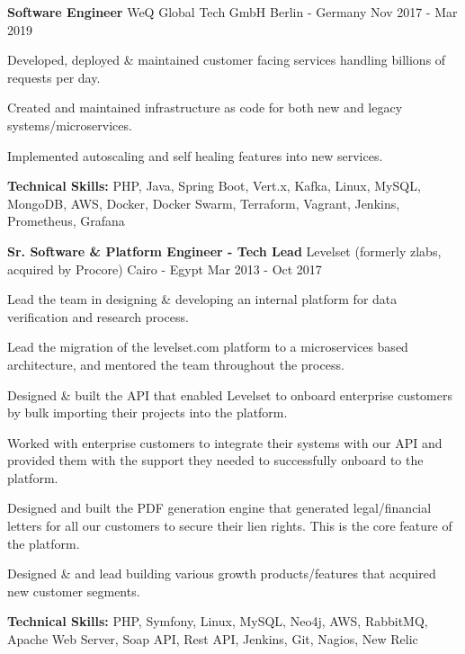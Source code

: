 \begin{cventries}
	\cventry
	{\textbf{Software Engineer}} %
	{WeQ Global Tech GmbH} %
	{Berlin - Germany} %
	{Nov 2017 - Mar 2019} %
	{
		\begin{cvitems} %
			\item {Developed, deployed \& maintained customer facing services handling billions of requests per day.}
			\item {Created and maintained infrastructure as code for both new and legacy systems/microservices.}
			\item {Implemented autoscaling and self healing features into new services.}
			\item {\textbf{Technical Skills:} PHP, Java, Spring Boot, Vert.x, Kafka, Linux, MySQL, MongoDB, AWS, Docker,
			            Docker Swarm, Terraform, Vagrant, Jenkins, Prometheus, Grafana}
		\end{cvitems}
	}

	\cventry
	{\textbf{Sr. Software \& Platform Engineer - Tech Lead}} %
	{Levelset (formerly zlabs, acquired by Procore)} %
	{Cairo - Egypt} %
	{Mar 2013 - Oct 2017} %
	{
		\begin{cvitems} %
			\item {Lead the team in designing \& developing an internal platform for data verification and research process.}
			\item {Lead the migration of the levelset.com platform to a microservices based architecture, and mentored the
			            team throughout the process.}
			\item {Designed \& built the API that enabled Levelset to onboard enterprise customers by bulk importing their
			            projects into the platform.}
			\item {Worked with enterprise customers to integrate their systems with our API and provided them with the support
			            they needed to successfully onboard to the platform.}
			\item {Designed and built the PDF generation engine that generated legal/financial letters for all our customers
			            to secure their lien rights. This is the core feature of the platform.}
			\item {Designed \& and lead building various growth products/features that acquired new customer segments.}
			\item {\textbf{Technical Skills:} PHP, Symfony, Linux, MySQL, Neo4j, AWS, RabbitMQ, Apache Web Server, Soap API,
			            Rest API, Jenkins, Git, Nagios, New Relic}
		\end{cvitems}
	}


\end{cventries}
